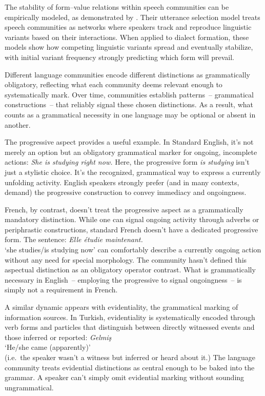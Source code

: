 \documentclass[12pt,letterpaper]{article}
\newcommand{\olang}[1]{\textit{#1}}
\begin{document}
The stability of form--value relations within speech communities can be empirically modeled, as demonstrated by \textcite{blythe2009speech}. Their utterance selection model treats speech communities as networks where speakers track and reproduce linguistic variants based on their interactions. When applied to dialect formation, these models show how competing linguistic variants spread and eventually stabilize, with initial variant frequency strongly predicting which form will prevail.

Different language communities encode different distinctions as grammatically obligatory, reflecting what each community deems relevant enough to systematically mark. Over time, communities establish patterns~-- grammatical constructions~-- that reliably signal these chosen distinctions. As a result, what counts as a grammatical necessity in one language may be optional or absent in another.

The progressive aspect provides a useful example. In Standard English, it's not merely an option but an obligatory grammatical marker for ongoing, incomplete actions:
\ea
\textit{She is studying right now.}
\z
Here, the progressive form \textit{is studying} isn't just a stylistic choice. It's the recognized, grammatical way to express a currently unfolding activity. English speakers strongly prefer (and in many contexts, demand) the progressive construction to convey immediacy and ongoingness.

French, by contrast, doesn't treat the progressive aspect as a grammatically mandatory distinction. While one can signal ongoing activity through adverbs or periphrastic constructions, standard French doesn't have a dedicated progressive form. The sentence:
\ea
\olang{Elle étudie maintenant.}\\
`she studies/is studying now'
\z
can comfortably describe a currently ongoing action without any need for special morphology. The community hasn't defined this aspectual distinction as an obligatory operator contrast. What is grammatically necessary in English~-- employing the progressive to signal ongoingness~-- is simply not a requirement in French.

A similar dynamic appears with evidentiality, the grammatical marking of information sources. In Turkish, evidentiality is systematically encoded through verb forms and particles that distinguish between directly witnessed events and those inferred or reported:
\ea
\textit{Gelmiş}\\
`He/she came (apparently)' \\(i.e.\, the speaker wasn't a witness but inferred or heard about it.)
\z
The language community treats evidential distinctions as central enough to be baked into the grammar. A speaker can't simply omit evidential marking without sounding ungrammatical.
\end{document}
